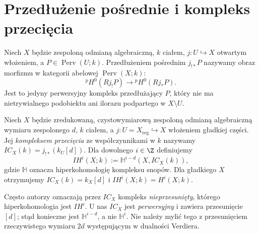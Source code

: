 \section{Przedłużenie pośrednie i kompleks przecięcia}
\begin{definicja}
\label{def:middle-extension-xiii}
Niech $X$ będzie zespoloną odmianą algebraiczną,
$k$ ciałem, $j:U\hookrightarrow X$ otwartym włożeniem,
a $P\in\operatorname{Perv}(U;k)$.
Przedłużeniem pośrednim $j_{!*}P$ nazywamy obraz
morfizmu w kategorii abelowej $\operatorname{Perv}(X;k)$:
\[
{}^p\!H^0(Rj_!P)\longrightarrow {}^p\!H^0(Rj_*P).
\]
Jest to jedyny perwersyjny kompleks przedłużający $P$,
który nie ma nietrywialnego podobiektu ani ilorazu
podpartego w $X\setminus U$.
\end{definicja}
\begin{definicja}
\label{def:ic-xiii}
Niech $X$ będzie zredukowaną, czystowymiarową zespoloną
odmianą algebraiczną wymiaru zespolonego $d$,
$k$ ciałem, a $j:U=X_{\mathrm{reg}}\hookrightarrow X$ włożeniem
gładkiej części. Jej \emph{kompleksem przecięcia}
ze współczynnikami w $k$ nazywamy
$IC_X(k)=j_{!*}(k_U[d])$.
Dla dowolnego $i\in\Z$ definiujemy
\[
IH^i(X;k):=\mathbb H^{i-d}(X,IC_X(k)),
\]
gdzie $\mathbb H$ oznacza hiperkohomologię kompleksu snopów.
Dla gładkiego $X$ otrzymujemy $IC_X(k)=k_X[d]$
i $IH^i(X;k)=H^i(X;k)$.
\end{definicja}
\begin{uwaga}
Często autorzy oznaczają przez $IC_X$ kompleks
\emph{nieprzesunięty}, którego hiperkohomologia
jest $IH^i$. U nas $IC_X$ jest \emph{perwersyjny}
i zawiera przesunięcie $[d]$; stąd konieczne jest
$\mathbb H^{i-d}$, a nie $\mathbb H^i$.
Nie należy mylić tego z przesunięciem rzeczywistego
wymiaru $2d$ występującym w dualności Verdiera.
\end{uwaga}

